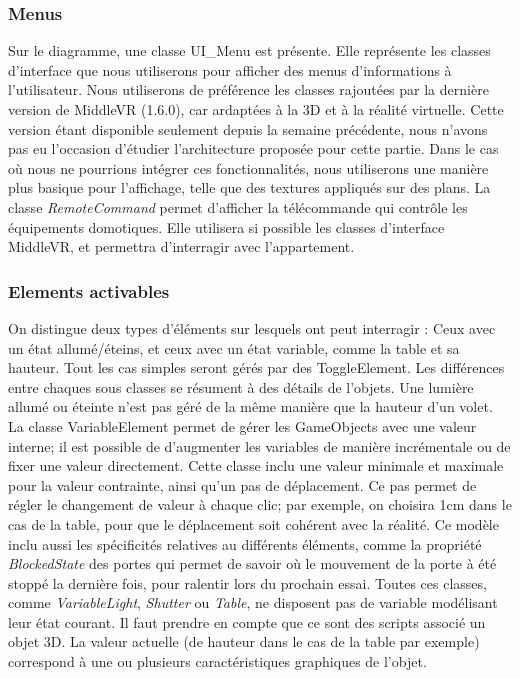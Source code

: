 \subsubsection{Menus}
Sur le diagramme, une classe UI\_Menu est présente. Elle représente les classes d'interface que nous utiliserons pour afficher des menus d'informations à l'utilisateur.
Nous utiliserons de préférence les classes rajoutées par la dernière version de MiddleVR (1.6.0), car ardaptées à la 3D et à la réalité virtuelle.
Cette version étant disponible seulement depuis la semaine précédente, nous n'avons pas eu l'occasion d'étudier l'architecture proposée pour cette partie.
Dans le cas où nous ne pourrions intégrer ces fonctionnalités, nous utiliserons une manière plus basique pour l'affichage, telle que des textures appliqués sur des plans.
\newline
La classe \textit{RemoteCommand} permet d'afficher la télécommande qui contrôle les équipements domotiques. 
Elle utilisera si possible les classes d'interface MiddleVR, et permettra d'interragir avec l'appartement.


\subsubsection{Elements activables}
On distingue deux types d'éléments sur lesquels ont peut interragir : Ceux avec un état allumé/éteins, et ceux avec un état variable, comme la table et sa hauteur.
Tout les cas simples seront gérés par des ToggleElement. Les différences entre chaques sous classes se résument à des détails de l'objets.
Une lumière allumé ou éteinte n'est pas géré de la même manière que la hauteur d'un volet.
La classe VariableElement permet de gérer les GameObjects avec une valeur interne; il est possible de d'augmenter les variables de manière incrémentale ou de fixer une valeur directement.
Cette classe inclu une valeur minimale et maximale pour la valeur contrainte, ainsi qu'un pas de déplacement.
Ce pas permet de régler le changement de valeur à chaque clic; par exemple, on choisira 1cm dans le cas de la table, pour que le déplacement soit cohérent avec la réalité.
Ce modèle inclu aussi les spécificités relatives au différents éléments, comme la propriété \textit{BlockedState} des portes qui permet de savoir où le mouvement de la porte à été stoppé la dernière fois, pour ralentir lors du prochain essai.
\newline
Toutes ces classes, comme \textit{VariableLight}, \textit{Shutter} ou \textit{Table},  ne disposent pas de variable modélisant leur état courant. 
Il faut prendre en compte que ce sont des scripts associé un objet 3D. 
La valeur actuelle (de hauteur dans le cas de la table par exemple) correspond à une ou plusieurs caractéristiques graphiques de l'objet.

